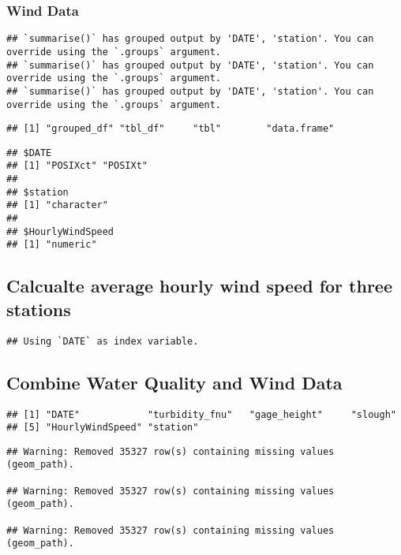 \documentclass[
]{article}
\begin{document}
\hypertarget{wind-data-1}{%
\subsubsection{Wind Data}\label{wind-data-1}}

\begin{verbatim}
## `summarise()` has grouped output by 'DATE', 'station'. You can override using the `.groups` argument.
## `summarise()` has grouped output by 'DATE', 'station'. You can override using the `.groups` argument.
## `summarise()` has grouped output by 'DATE', 'station'. You can override using the `.groups` argument.
\end{verbatim}

\begin{verbatim}
## [1] "grouped_df" "tbl_df"     "tbl"        "data.frame"
\end{verbatim}

\begin{verbatim}
## $DATE
## [1] "POSIXct" "POSIXt" 
## 
## $station
## [1] "character"
## 
## $HourlyWindSpeed
## [1] "numeric"
\end{verbatim}

\hypertarget{calcualte-average-hourly-wind-speed-for-three-stations}{%
\subsection{Calcualte average hourly wind speed for three
stations}\label{calcualte-average-hourly-wind-speed-for-three-stations}}

\begin{verbatim}
## Using `DATE` as index variable.
\end{verbatim}

\hypertarget{combine-water-quality-and-wind-data}{%
\subsection{Combine Water Quality and Wind
Data}\label{combine-water-quality-and-wind-data}}

\begin{verbatim}
## [1] "DATE"            "turbidity_fnu"   "gage_height"     "slough"         
## [5] "HourlyWindSpeed" "station"
\end{verbatim}

\begin{verbatim}
## Warning: Removed 35327 row(s) containing missing values (geom_path).

## Warning: Removed 35327 row(s) containing missing values (geom_path).

## Warning: Removed 35327 row(s) containing missing values (geom_path).
\end{verbatim}
\end{document}
